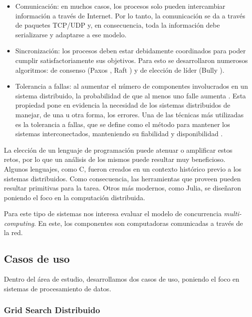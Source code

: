 \documentclass[11pt]{article}
\let\Oldsubsection\subsection
\renewcommand{\subsection}{\FloatBarrier\Oldsubsection}
\let\Oldsubsubsection\subsubsection
\renewcommand{\subsubsection}{\FloatBarrier\Oldsubsubsection}
\newcommand{\english}[1]{\textit{#1}}
\begin{document}
\begin{itemize}
    \item Comunicación: en muchos casos, los procesos solo pueden intercambiar información a través de Internet. Por lo tanto, la comunicación se da a través de paquetes TCP/UDP y, en consecuencia, toda la información debe serializarse y adaptarse a ese modelo.

    \item Sincronización: los procesos deben estar debidamente coordinados para poder cumplir satisfactoriamente sus objetivos. Para esto se desarrollaron numerosos algoritmos: de consenso (Paxos \cite{sis_dist:paxos}, Raft \cite{sis_dist:raft}) y de elección de líder (Bully \cite{sis_dist:bully}).

    \item Tolerancia a fallas: al aumentar el número de componentes involucrados en un sistema distribuido, la probabilidad de que al menos uno falle aumenta \cite{sis_dist:growth_fail}. Esta propiedad pone en evidencia la necesidad de los sistemas distribuidos de manejar, de una u otra forma, los errores. Una de las técnicas más utilizadas es la tolerancia a fallas, que se define como el método para mantener los sistemas interconectados, manteniendo su fiabilidad y disponibilidad \cite{sis_dist:fault_tol}.
\end{itemize}

La elección de un lenguaje de programación puede atenuar o amplificar estos retos, por lo que un análisis de los mismos puede resultar muy beneficioso. Algunos lenguajes, como C, fueron creados en un contexto histórico previo a los sistemas distribuidos. Como consecuencia, las herramientas que proveen pueden resultar primitivas para la tarea. Otros más modernos, como Julia, se diseñaron poniendo el foco en la computación distribuida.

Para este tipo de sistemas nos interesa evaluar el modelo de concurrencia \english{multi-computing}. En este, los componentes son computadoras comunicadas a través de la red.

\newpage

\subsection{Casos de uso}

Dentro del área de estudio, desarrollamos dos casos de uso, poniendo el foco en sistemas de procesamiento de datos.

\subsubsection{Grid Search Distribuido}
\end{document}
